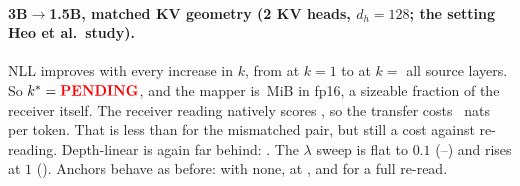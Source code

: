 \paragraph{3B$\to$1.5B, matched KV geometry (2 KV heads, $d_h=128$; the setting Heo et al.\ study).}
NLL improves with every increase in $k$, from  at $k=1$ to  at $k=$ all  source layers.
So $k^*=\res{fit.3b-15b.kstar}$, and the mapper is \,MiB in fp16, a sizeable fraction of the receiver itself.
The receiver reading natively scores , so the transfer costs ~nats per token.
That is less than for the mismatched pair, but still a cost against re-reading.
Depth-linear is again far behind: .
The $\lambda$ sweep is flat to $0.1$ (--) and rises at $1$ ().
Anchors behave as before:  with none,  at , and  for a full re-read.
